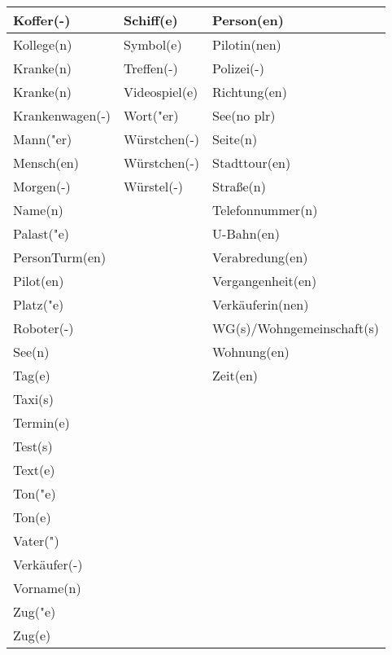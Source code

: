 \documentclass{article}
\begin{document}
\begin{table}[h!]
\begin{tabular}{|>{\raggedright\arraybackslash}p{5cm}|>{\raggedright\arraybackslash}p{5cm}|>{\raggedright\arraybackslash}p{5cm}|}
        Koffer(-) & Schiff(e) & Person(en) \\\hline
        Kollege(n) & Symbol(e) & Pilotin(nen) \\\hline
        Kranke(n) & Treffen(-) & Polizei(-) \\\hline
        Kranke(n) & Videospiel(e) & Richtung(en) \\\hline
        Krankenwagen(-) & Wort("er) & See(no plr) \\\hline
        Mann("er) & Würstchen(-) & Seite(n) \\\hline
        Mensch(en) & Würstchen(-) & Stadttour(en) \\\hline
        Morgen(-) & Würstel(-) & Stra\ss{}e(n) \\\hline
        Name(n) &  & Telefonnummer(n) \\\hline
        Palast("e) &  & U-Bahn(en) \\\hline
        PersonTurm(en) &  & Verabredung(en) \\\hline
        Pilot(en) &  & Vergangenheit(en) \\\hline
        Platz("e) &  & Verkäuferin(nen) \\\hline
        Roboter(-) &  & WG(s)/Wohngemeinschaft(s) \\\hline
        See(n) &  & Wohnung(en) \\\hline
        Tag(e) &  & Zeit(en) \\\hline
        Taxi(s) &  &  \\\hline
        Termin(e) &  &  \\\hline
        Test(s) &  &  \\\hline
        Text(e) &  &  \\\hline
        Ton("e) &  &  \\\hline
        Ton(e) &  &  \\\hline
        Vater(") &  &  \\\hline
        Verkäufer(-) &  &  \\\hline
        Vorname(n) &  &  \\\hline
        Zug("e) &  &  \\\hline
        Zug(e) &  &  \\\hline
    \end{tabular}
\end{table}
\end{document}

